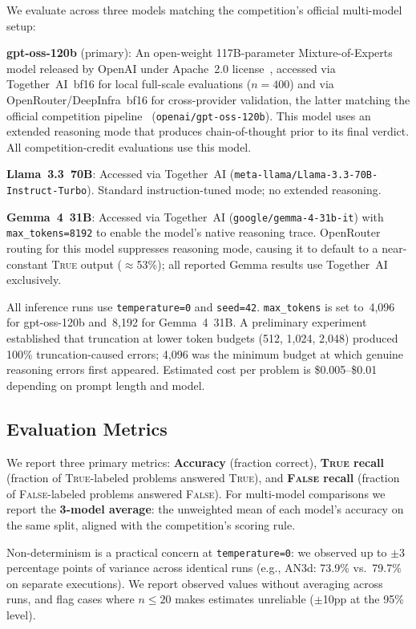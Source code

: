 \documentclass[11pt]{article}
\begin{document}
We evaluate across three models matching the competition's official
multi-model setup:

\textbf{gpt-oss-120b} (primary): An open-weight 117B-parameter
Mixture-of-Experts model released by OpenAI under Apache~2.0
license~\citep{openai2025gptoss}, accessed via Together~AI~bf16 for local full-scale evaluations
($n=400$) and via OpenRouter/DeepInfra~bf16 for cross-provider
validation, the latter matching the official competition
pipeline~\citep{sair2026judge}
(\texttt{openai/gpt-oss-120b}). This model uses an
extended reasoning mode that produces chain-of-thought prior to its
final verdict. All competition-credit evaluations use this model.

\textbf{Llama~3.3~70B}: Accessed via Together~AI
(\texttt{meta-llama/Llama-3.3-70B-Instruct-Turbo}). Standard
instruction-tuned mode; no extended reasoning.

\textbf{Gemma~4~31B}: Accessed via Together~AI
(\texttt{google/gemma-4-31b-it}) with \texttt{max\_tokens=8192} to
enable the model's native reasoning trace. OpenRouter routing for this
model suppresses reasoning mode, causing it to default to a
near-constant \textsc{True} output ($\approx$53\%); all reported Gemma
results use Together~AI exclusively.

All inference runs use \texttt{temperature=0} and \texttt{seed=42}.
\texttt{max\_tokens} is set to~4{,}096 for gpt-oss-120b and~8{,}192
for Gemma~4~31B. A preliminary experiment established that truncation
at lower token budgets (512, 1{,}024, 2{,}048) produced 100\%
truncation-caused errors; 4{,}096 was the minimum budget at which
genuine reasoning errors first appeared. Estimated cost per problem is
\$0.005--\$0.01 depending on prompt length and model.

\subsection{Evaluation Metrics}

We report three primary metrics:
\textbf{Accuracy} (fraction correct),
\textbf{\textsc{True} recall} (fraction of \textsc{True}-labeled
problems answered \textsc{True}), and
\textbf{\textsc{False} recall} (fraction of \textsc{False}-labeled
problems answered \textsc{False}).
For multi-model comparisons we report the \textbf{3-model average}:
the unweighted mean of each model's accuracy on the same split, aligned
with the competition's scoring rule.

Non-determinism is a practical concern at \texttt{temperature=0}: we
observed up to $\pm$3 percentage points of variance across identical
runs (e.g., AN3d: 73.9\% vs.\ 79.7\% on separate executions). We
report observed values without averaging across runs, and flag cases
where $n \leq 20$ makes estimates unreliable ($\pm$10pp at the 95\%
level).
\end{document}
